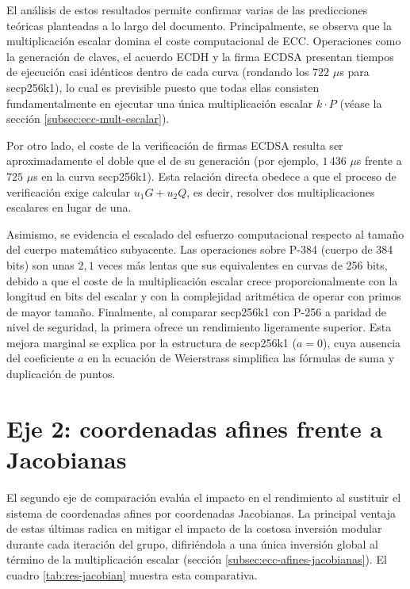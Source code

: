 El análisis de estos resultados permite confirmar varias de las predicciones teóricas planteadas a lo largo del documento. Principalmente, se observa que la multiplicación escalar domina el 
coste computacional de ECC. Operaciones como la generación de claves, el acuerdo ECDH y la firma ECDSA presentan tiempos de ejecución casi idénticos dentro de cada curva 
(rondando los 722 $\mu$s para secp256k1), lo cual es previsible puesto que todas ellas consisten fundamentalmente en ejecutar una única multiplicación escalar $k \cdot P$ 
(véase la sección \ref{subsec:ecc-mult-escalar}).

Por otro lado, el coste de la verificación de firmas ECDSA resulta ser aproximadamente el doble que el de su generación (por ejemplo, $1\,436$ $\mu$s frente a $725$ $\mu$s en la curva secp256k1). 
Esta relación directa obedece a que el proceso de verificación exige calcular $u_1 G + u_2 Q$, es decir, resolver dos multiplicaciones escalares en lugar de una. 

Asimismo, se evidencia el escalado del esfuerzo computacional respecto al tamaño del cuerpo matemático subyacente. Las operaciones sobre P-384 (cuerpo de 384 bits) son unas $2{,}1$ veces más 
lentas que sus equivalentes en curvas de 256 bits, debido a que el coste de la multiplicación escalar crece proporcionalmente con la longitud en bits del escalar y con la complejidad aritmética 
de operar con primos de mayor tamaño. Finalmente, al comparar secp256k1 con P-256 a paridad de nivel de seguridad, la primera ofrece un rendimiento ligeramente superior. 
Esta mejora marginal se explica por la estructura de secp256k1 ($a = 0$), cuya ausencia del coeficiente $a$ en la ecuación de Weierstrass simplifica las fórmulas de suma y duplicación de puntos.

\section{Eje 2: coordenadas afines frente a Jacobianas}
\label{sec:res-coordenadas}

El segundo eje de comparación evalúa el impacto en el rendimiento al sustituir el sistema de coordenadas afines por coordenadas Jacobianas. La principal ventaja de estas últimas radica en 
mitigar el impacto de la costosa inversión modular durante cada iteración del grupo, difiriéndola a una única inversión global al término de la multiplicación escalar 
(sección \ref{subsec:ecc-afines-jacobianas}). El cuadro \ref{tab:res-jacobian} muestra esta comparativa.


